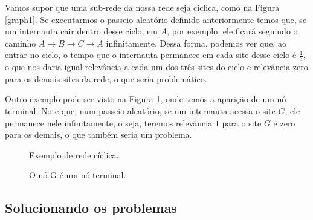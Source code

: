 \documentclass{article}
\begin{document}
Vamos supor que uma sub-rede da nossa rede seja cíclica, como na Figura \ref{graph1}. Se executarmos o passeio aleatório definido anteriormente temos que, se um internauta cair dentro desse ciclo, em $A$, por exemplo, ele ficará seguindo o caminho $A\to B\to C\to A$ infinitamente. Dessa forma, podemos ver que, ao entrar no ciclo, o tempo que o internauta permanece em cada site desse ciclo é $\frac{1}{3}$, o que nos daria igual relevância a cada um dos três sites do ciclo e relevância zero para os demais sites da rede, o que seria problemático.

Outro exemplo pode ser visto na Figura \ref{graph2}, onde temos a aparição de um nó terminal. Note que, num passeio aleatório, se um internauta acessa o site $G$, ele permanece nele infinitamente, o seja, teremos relevância $1$ para o site $G$ e zero para os demais, o que também seria um problema.
\begin{figure}[H]
    \centering
    \begin{minipage}{.5\textwidth}
        \centering
        \caption{Exemplo de rede cíclica.}
        \label{graph1}
    \end{minipage}%
    \begin{minipage}{.5\textwidth}
        \centering
        \caption{O nó G é um nó terminal.}
        \label{graph2}
    \end{minipage}
\end{figure}

\subsection*{Solucionando os problemas}
\end{document}
